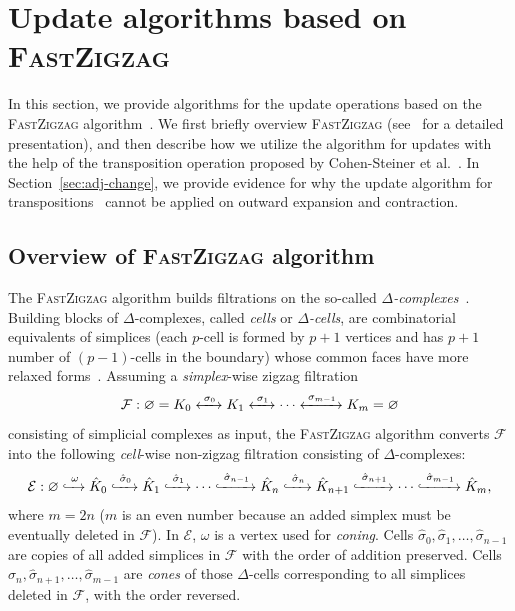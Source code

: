 \documentclass[letterpaper,11pt]{article}
\theoremstyle{mythmstyle}
\theoremstyle{mydefstyle}
\theoremstyle{plain}
\theoremstyle{definition}
\newcommand{\<}[1]{\langle #1\rangle}
\newcommand{\lbarrowspace}{\;}
\newcommand{\lrarrowsp}[1]{\xleftrightarrow{\lbarrowspace#1\lbarrowspace}}
\let\leftrightarrowsp\lrarrowsp
\newcommand{\inctosp}[1]{\xhookrightarrow{\lbarrowspace#1\lbarrowspace}}
\let\emptyset\varnothing
\newcommand{\Ecal}{\mathcal{E}}
\newcommand{\Fcal}{\mathcal{F}}
\newcommand{\DG}{\Delta}
\newcommand{\oG}{\omega}
\newcommand{\filtcnt}{m}
\newcommand{\simpcnt}{n}
\newcommand{\fsimp}[2]{\sigma_{#2}}
\newcommand{\ef}{\Ecal}
\newcommand{\hatfsimp}{\hat{\sigma}}
\begin{document}
\section{Update algorithms based on \textsc{FastZigzag}}
\label{sec:fzz-up}

In this section,
we provide algorithms for the update operations
based on the \textsc{FastZigzag} algorithm~\cite{dey2022fast}.
We first briefly overview \textsc{FastZigzag}
(see~\cite{dey2022fast} for a detailed presentation),
and then describe how we utilize the algorithm for updates
with the help of the {transposition} operation proposed by Cohen-Steiner et al.~\cite{cohen2006vines}.
In Section~\ref{sec:adj-change},
we provide evidence for why the update algorithm for transpositions~\cite{cohen2006vines} cannot be
applied on outward expansion and contraction.

\subsection{Overview of \textsc{FastZigzag} algorithm}
\label{sec:fzz}

The \textsc{FastZigzag} algorithm
builds filtrations 
on the so-called \emph{$\DG$-complexes}~\cite{hatcher2002algebraic}.
Building blocks of $\DG$-complexes,
called \emph{cells} or \emph{$\DG$-cells},
are combinatorial equivalents
of simplices
(each $p$-cell is
formed by $p+1$ vertices
and has $p+1$ number of $(p-1)$-cells in the boundary)
whose common faces have more
relaxed forms~\cite{dey2022fast}.
Assuming a \emph{simplex}-wise zigzag filtration 
\[\Fcal:
\emptyset=
K_0\leftrightarrowsp{\fsimp{}{0}} K_1\leftrightarrowsp{\fsimp{}{1}}
\cdots 
\leftrightarrowsp{\fsimp{}{\filtcnt-1}} K_\filtcnt
=\emptyset
\]
consisting of simplicial complexes as input,
the \textsc{FastZigzag} algorithm
converts $\Fcal$ into the following \emph{cell}-wise non-zigzag filtration
consisting of $\DG$-complexes:
\[\ef:\emptyset\inctosp{\oG}\hat{K}_0\inctosp{\hatfsimp_0} 
\hat{K}_1\inctosp{\hatfsimp_{1}}
\cdots\inctosp{\hatfsimp_{\simpcnt-1}} 
\hat{K}_{\simpcnt}
\inctosp{\hatfsimp_{\simpcnt}}
\hat{K}_{\simpcnt+1}
\inctosp{\hatfsimp_{\simpcnt+1}}
\cdots
\inctosp{\hatfsimp_{\filtcnt-1}} \hat{K}_{\filtcnt},\]
where $\filtcnt=2\simpcnt$
($\filtcnt$ is an even number because an added simplex
must be eventually deleted in ${\Fcal}$).
In $\ef$, $\oG$ is a vertex used for \emph{coning}.
Cells $\hatfsimp_0,\hatfsimp_1,\ldots,\hatfsimp_{\simpcnt-1}$ 
are copies of all added simplices in $\Fcal$ 
with the order of addition preserved.
Cells 
$\hatfsimp_{\simpcnt},\hatfsimp_{\simpcnt+1},\ldots,\hatfsimp_{\filtcnt-1}$ 
are \emph{cones} of those $\DG$-cells corresponding to all simplices deleted in $\Fcal$,
with the order reversed.
\end{document}
